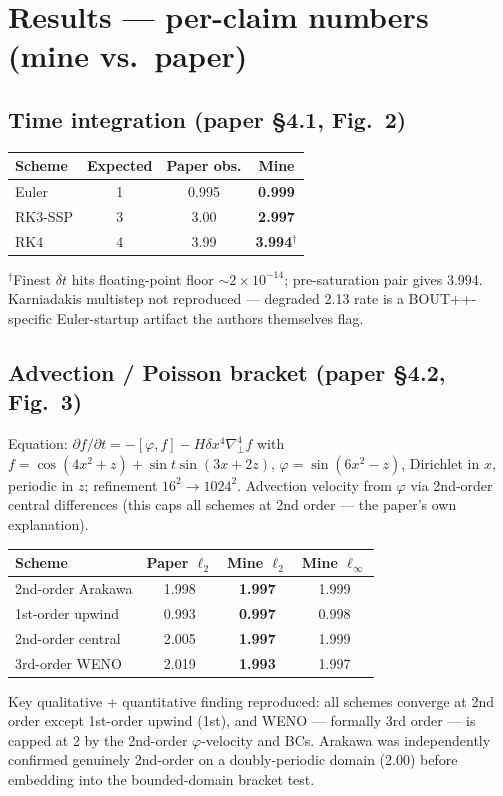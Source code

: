 \documentclass[11pt]{article}
\begin{document}
\section{Results --- per-claim numbers (mine vs.\ paper)}

\subsection{Time integration (paper \S4.1, Fig.~2)}
\begin{center}
\begin{tabular}{lccc}
\toprule
Scheme & Expected & Paper obs. & \textbf{Mine} \\ \midrule
Euler    & 1 & 0.995 & \textbf{0.999} \\
RK3-SSP  & 3 & 3.00  & \textbf{2.997} \\
RK4      & 4 & 3.99  & \textbf{3.994}$^\dagger$ \\ \bottomrule
\end{tabular}
\end{center}
$^\dagger$Finest $\delta t$ hits floating-point floor $\sim2\times10^{-14}$; pre-saturation pair gives 3.994. Karniadakis multistep not reproduced --- degraded 2.13 rate is a BOUT++-specific Euler-startup artifact the authors themselves flag.

\subsection{Advection / Poisson bracket (paper \S4.2, Fig.~3)}
Equation: $\partial f/\partial t = -[\varphi,f] - H\delta x^4 \nabla^4_\perp f$ with $f = \cos(4x^2+z) + \sin t\sin(3x+2z)$, $\varphi = \sin(6x^2 - z)$, Dirichlet in $x$, periodic in $z$; refinement $16^2 \to 1024^2$. Advection velocity from $\varphi$ via 2nd-order central differences (this caps all schemes at 2nd order --- the paper's own explanation).
\begin{center}
\begin{tabular}{lccc}
\toprule
Scheme & Paper $\ell_2$ & \textbf{Mine $\ell_2$} & Mine $\ell_\infty$ \\ \midrule
2nd-order Arakawa   & 1.998 & \textbf{1.997} & 1.999 \\
1st-order upwind    & 0.993 & \textbf{0.997} & 0.998 \\
2nd-order central   & 2.005 & \textbf{1.997} & 1.999 \\
3rd-order WENO      & 2.019 & \textbf{1.993} & 1.997 \\ \bottomrule
\end{tabular}
\end{center}
Key qualitative + quantitative finding reproduced: all schemes converge at 2nd order except 1st-order upwind (1st), and WENO --- formally 3rd order --- is capped at 2 by the 2nd-order $\varphi$-velocity and BCs. Arakawa was independently confirmed genuinely 2nd-order on a doubly-periodic domain (2.00) before embedding into the bounded-domain bracket test.
\end{document}
